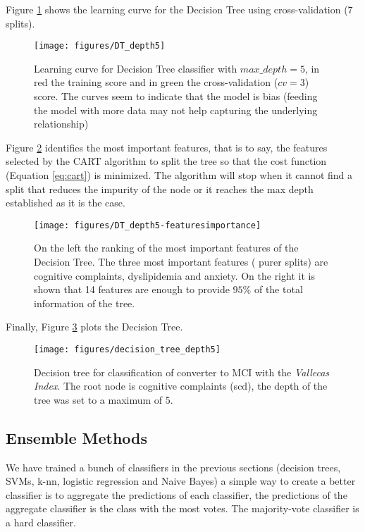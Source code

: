 \documentclass[11pt]{article}
\theoremstyle{definition}
\theoremstyle{remark}
\begin{document}
Figure \ref{fig:dt-md5-learning} shows the learning curve for the Decision Tree using cross-validation (7 splits). 
\begin{figure}[H]
        \centering
        \texttt{[image: figures/DT\_depth5]}
        \caption{Learning curve for Decision Tree classifier with $max\_depth=5$, in red the training score and in green the cross-validation ($cv=3$) score. The curves seem to indicate that the model is bias (feeding the model with more data may not help capturing the underlying relationship)
        } \label{fig:dt-md5-learning}
\end{figure}

Figure \ref{fig:dt-md5-features} identifies the most important features, that is to say, the features selected by the CART algorithm to split the tree so that the cost function (Equation \ref{eq:cart}) is minimized. The algorithm will stop when it cannot find a split that reduces the impurity of the node or it reaches the max depth established as it is the case.
\begin{figure}[H]
        \centering
        \texttt{[image: figures/DT\_depth5-featuresimportance]}
        \caption{On the left the ranking of the most important features of the Decision Tree. The three most important features ( purer splits) are cognitive complaints, dyslipidemia and anxiety. On the right it is shown that 14 features are enough to provide $95\%$ of the total information of the tree.   
        } \label{fig:dt-md5-features}
\end{figure}

Finally, Figure \ref{fig:dt-md5-dot} plots the Decision Tree. 
\begin{figure}[H]
        \centering
        \texttt{[image: figures/decision\_tree\_depth5]}
        \caption{Decision tree for classification of converter to MCI with the \emph{Vallecas Index}. The root node is cognitive complaints (scd), the depth of the tree was set to a maximum of 5.
        } \label{fig:dt-md5-dot}
\end{figure}


\subsection{Ensemble Methods}
\label{se:resensemble}

We have trained a bunch of classifiers in the previous sections (decision trees, SVMs, k-nn, logistic regression and Naive Bayes) a simple way to create a better classifier is to aggregate the predictions of each classifier, the predictions of the aggregate classifier is the class with the most votes. The majority-vote classifier is a hard classifier. 
\end{document}
